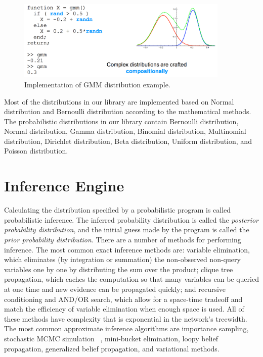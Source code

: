 \begin{figure}
    \centering
    \includegraphics[width=0.9\textwidth]{figures/gmm.png}
    \caption{Implementation of GMM distribution example.}
    \label{fig:gmm}
\end{figure}


Most of the distributions in our library are implemented based on Normal distribution and Bernoulli distribution according to the mathematical methods. The probabilistic distributions in our library contain Bernoulli distribution, Normal distribution, Gamma distribution, Binomial distribution, Multinomial distribution, Dirichlet distribution, Beta distribution, Uniform distribution, and Poisson distribution.

\section{Inference Engine}
\label{sec:infer}
Calculating the distribution specified by a probabilistic program is called probabilistic inference. The inferred probability distribution is called the \textit{posterior probability distribution}, and the initial guess made by the program is called the \textit{prior probability distribution}. There are a number of methods for performing inference. The most common exact inference methods are: variable elimination, which eliminates (by integration or summation) the non-observed non-query variables one by one by distributing the sum over the product; clique tree propagation, which caches the computation so that many variables can be queried at one time and new evidence can be propagated quickly; and recursive conditioning and AND/OR search, which allow for a space-time tradeoff and match the efficiency of variable elimination when enough space is used. All of these methods have complexity that is exponential in the network's treewidth. The most common approximate inference algorithms are importance sampling, stochastic MCMC simulation ~\cite{mcmc}, mini-bucket elimination, loopy belief propagation, generalized belief propagation, and variational methods.

